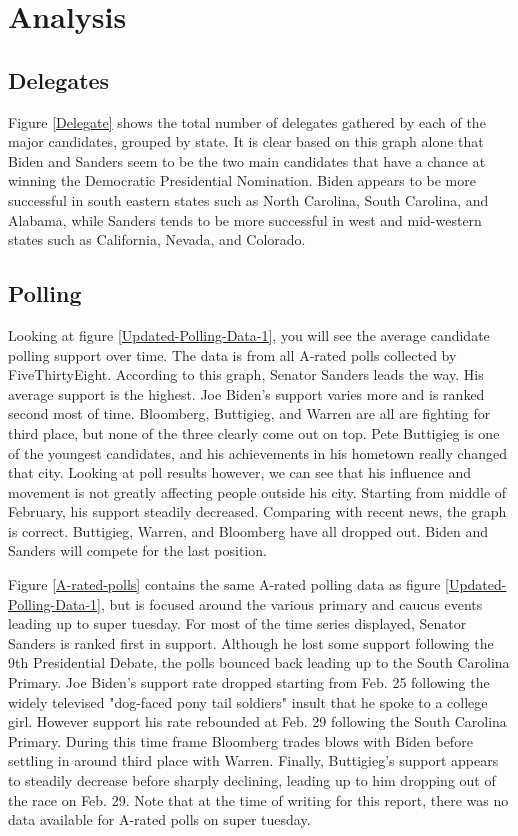 \section{Analysis}\label{analysis}

\subsection{Delegates}

Figure \ref{Delegate} shows the total number of delegates gathered by each of the major candidates, grouped by state. It is clear based on this graph alone that Biden and Sanders seem to be the two main candidates that have a chance at winning the Democratic Presidential Nomination. Biden appears to be more successful in south eastern states such as North Carolina, South Carolina, and Alabama, while Sanders tends to be more successful in west and mid-western states such as California, Nevada, and Colorado.

\subsection{Polling}

Looking at figure \ref{Updated-Polling-Data-1}, you will see the average candidate polling support over time. The data is from all A-rated polls collected by FiveThirtyEight. According to this graph, Senator Sanders leads the way. His average support is the highest. Joe Biden's support varies more and is ranked second most of time. Bloomberg, Buttigieg, and Warren are all are fighting for third place, but none of the three clearly come out on top. Pete Buttigieg is one of the youngest candidates, and his achievements in his hometown really changed that city. Looking at poll results however, we can see that his influence and movement is not greatly affecting people outside his city. Starting from middle of February, his support steadily decreased. Comparing with recent news, the graph is correct. Buttigieg, Warren, and Bloomberg have all dropped out. Biden and Sanders will compete for the last position.

Figure \ref{A-rated-polls} contains the same A-rated polling data as figure \ref{Updated-Polling-Data-1}, but is focused around the various primary and caucus events leading up to super tuesday. For most of the time series displayed, Senator Sanders is ranked first in support. Although he lost some support following the 9th Presidential Debate, the polls bounced back leading up to the South Carolina Primary. Joe Biden's support rate dropped starting from Feb. 25 following the widely televised "dog-faced pony tail soldiers" insult that he spoke to a college girl. However support his rate rebounded at Feb. 29 following the South Carolina Primary. During this time frame Bloomberg trades blows with Biden before settling in around third place with Warren. Finally, Buttigieg's support appears to steadily decrease before sharply declining, leading up to him dropping out of the race on Feb. 29. Note that at the time of writing for this report, there was no data available for A-rated polls on super tuesday.

